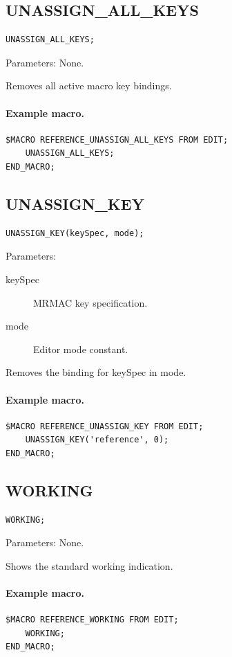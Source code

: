 \documentclass[a4paper,10pt,twoside,openany]{book}
\newenvironment{mrmacextension}{\begin{changebar}}{\end{changebar}}
\begin{document}
\label{prim:procedure-unassign-all-keys}
\subsection*{UNASSIGN\_ALL\_KEYS}
\begin{verbatim}
UNASSIGN_ALL_KEYS;
\end{verbatim}
Parameters: None.

Removes all active macro key bindings.

\paragraph{Example macro.}
\begin{verbatim}
$MACRO REFERENCE_UNASSIGN_ALL_KEYS FROM EDIT;
    UNASSIGN_ALL_KEYS;
END_MACRO;
\end{verbatim}

\label{prim:procedure-unassign-key}
\subsection*{UNASSIGN\_KEY}
\begin{verbatim}
UNASSIGN_KEY(keySpec, mode);
\end{verbatim}
Parameters:
\begin{description}
\item[keySpec] MRMAC key specification.
\item[mode] Editor mode constant.
\end{description}

Removes the binding for keySpec in mode.

\paragraph{Example macro.}
\begin{verbatim}
$MACRO REFERENCE_UNASSIGN_KEY FROM EDIT;
    UNASSIGN_KEY('reference', 0);
END_MACRO;
\end{verbatim}

\begin{mrmacextension}
\label{prim:procedure-working}
\subsection*{WORKING}
\begin{verbatim}
WORKING;
\end{verbatim}
Parameters: None.

Shows the standard working indication.

\paragraph{Example macro.}
\begin{verbatim}
$MACRO REFERENCE_WORKING FROM EDIT;
    WORKING;
END_MACRO;
\end{verbatim}
\end{mrmacextension}
\end{document}
